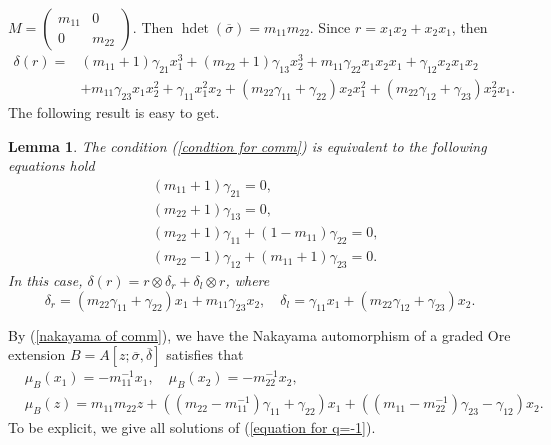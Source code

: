 \documentclass[a4paper,10pt]{amsart}
\newtheorem{lemma}[theorem]{Lemma}
\theoremstyle{definition}
\numberwithin{equation}{section}
\DeclareMathOperator{\hdet}{hdet}
\begin{document}
 $ M=
\left(
\begin{array}{cc}
m_{11}  & 0\\
0   &m_{22}
\end{array}
\right)$. Then $\hdet(\overline{\sigma})=m_{11}m_{22}$. Since $r=x_1x_2+x_2x_1$, then
\begin{align*}
\delta(r)=&(m_{11}+1)\gamma_{21}x_1^3+(m_{22}+1)\gamma_{13}x_2^3+m_{11}\gamma_{22}x_1x_2x_1+\gamma_{12}x_2x_1x_2\\
&+m_{11}\gamma_{23}x_1x_2^2+\gamma_{11}x_1^2x_2+(m_{22}\gamma_{11}+\gamma_{22})x_2x_1^2+(m_{22}\gamma_{12}+\gamma_{23})x_2^2x_1.
\end{align*}
The following result is easy to get.
\begin{lemma}
The condition (\ref{condtion for comm}) is equivalent to the following equations hold
\begin{equation}\label{equation for q=-1}
\begin{aligned}
&(m_{11}+1)\gamma_{21}=0,\\
&(m_{22}+1)\gamma_{13}=0,\\
&(m_{22}+1)\gamma_{11}+(1-m_{11})\gamma_{22}=0,\\
&(m_{22}-1)\gamma_{12}+(m_{11}+1)\gamma_{23}=0.
\end{aligned}
\end{equation}
In this case, $\delta(r)=r\otimes \delta_r+\delta_l\otimes r$, where
\begin{equation*}\label{delta_l,r for q=-1}
\delta_{r}=(m_{22}\gamma_{11}+\gamma_{22})x_1+m_{11}\gamma_{23}x_2,\quad
\delta_{l}=\gamma_{11}x_1+(m_{22}\gamma_{12}+\gamma_{23})x_2.
\end{equation*}
\end{lemma}
By (\ref{nakayama of comm}), we have the Nakayama automorphism of a graded Ore extension $B=A[z;\overline{\sigma},\overline{\delta}]$ satisfies that
 \begin{equation}\label{naka equa for q=-1}
 \begin{aligned}
    &\mu_B(x_1)=-m_{11}^{-1}x_1,\quad \mu_B(x_2)=-m_{22}^{-1}x_2,\\ &\mu_B(z)=m_{11}m_{22}z+((m_{22}-m_{11}^{-1})\gamma_{11}+\gamma_{22})x_1+((m_{11}-m_{22}^{-1})\gamma_{23}-\gamma_{12})x_2.
    \end{aligned}
 \end{equation}
To be explicit, we give all solutions of (\ref{equation for q=-1}).
\end{document}
